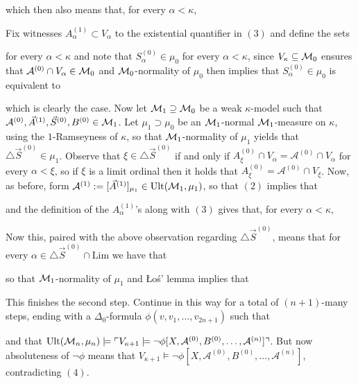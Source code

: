 \documentclass[../../main]{subfiles}
\begin{document}
{which then also means that, for every $\alpha<\kappa$,

Fix witnesses $A^{(1)}_\alpha\subset V_\alpha$ to the existential quantifier in $(3)$ and define the sets

for every $\alpha<\kappa$ and note that $S_\alpha^{(0)}\in\mu_0$ for every $\alpha<\kappa$, since $V_\kappa\subseteq\operatorname{\mathcal M}_0$ ensures that $\mathcal A^{(0)}\cap V_\alpha\in\operatorname{\mathcal M}_0$ and $\operatorname{\mathcal M}_0$-normality of $\mu_0$ then implies that $S_\alpha^{(0)}\in\mu_0$ is equivalent to

which is clearly the case. Now let $\operatorname{\mathcal M}_1\supseteq\operatorname{\mathcal M}_0$ be a weak $\kappa$-model such that $\mathcal A^{(0)},\vec A^{(1)},\vec S^{(0)},B^{(0)}\in\operatorname{\mathcal M}_1$. Let $\mu_1\supset\mu_0$ be an $\operatorname{\mathcal M}_1$-normal $\operatorname{\mathcal M}_1$-measure on $\kappa$, using the $1$-Ramseyness of $\kappa$, so that $\operatorname{\mathcal M}_1$-normality of $\mu_1$ yields that $\triangle\vec S^{(0)}\in\mu_1$. Observe that $\xi\in\triangle\vec S^{(0)}$ if and only if $A^{(0)}_\xi\cap V_\alpha=\mathcal A^{(0)}\cap V_\alpha$ for every $\alpha<\xi$, so if $\xi$ is a limit ordinal then it holds that $A^{(0)}_\xi=\mathcal A^{(0)}\cap V_\xi$. Now, as before, form $\mathcal A^{(1)}:=[\vec A^{(1)}]_{\mu_1}\in\operatorname{Ult}(\operatorname{\mathcal M}_1,\mu_1)$, so that $(2)$ implies that

and the definition of the $A_\alpha^{(1)}$'s along with $(3)$ gives that, for every $\alpha<\kappa$,

Now this, paired with the above observation regarding $\triangle\vec S^{(0)}$, means that for every $\alpha\in\triangle\vec S^{(0)}\cap\text{Lim}$ we have that

so that $\operatorname{\mathcal M}_1$-normality of $\mu_1$ and \L o\' s' lemma implies that

This finishes the second step. Continue in this way for a total of $(n+1)$-many steps, ending with a $\Delta_0$-formula $\phi(v,v_1,\hdots,v_{2n+1})$ such that

and that $\operatorname{Ult}(\operatorname{\mathcal M}_n,\mu_n)\models\ulcorner V_{\kappa+1}\models\lnot\phi[X,\mathcal A^{(0)},B^{(0)},\hdots,\mathcal A^{(n)}] \urcorner$. But now absoluteness of $\lnot\phi$ means that $V_{\kappa+1}\models\lnot\phi[X,\mathcal A^{(0)},B^{(0)},\hdots,\mathcal A^{(n)}]$, contradicting $(4)$.
}
\end{document}

